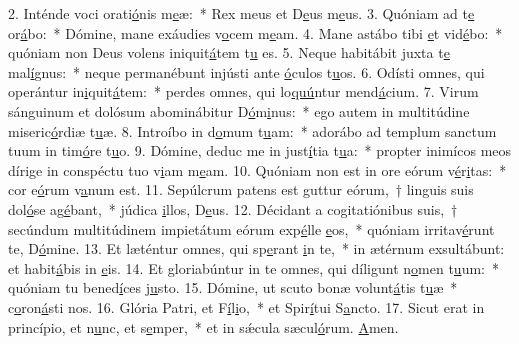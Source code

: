 2. Inténde voci orati\uline{ó}nis m\uline{e}æ:~* Rex meus et D\uline{e}us m\uline{e}us.
3. Quóniam ad t\uline{e} or\uline{á}bo:~* Dómine, mane exáudies v\uline{o}cem m\uline{e}am.
4. Mane astábo tibi \uline{e}t vid\uline{é}bo:~* quóniam non Deus volens iniquit\uline{á}tem t\uline{u} es.
5. Neque habitábit juxta t\uline{e} mal\uline{í}gnus:~* neque permanébunt injústi ante \uline{ó}culos t\uline{u}os.
6. Odísti omnes, qui operántur in\uline{i}quit\uline{á}tem:~* perdes omnes, qui lo\uline{quú}ntur mend\uline{á}cium.
7. Virum sánguinum et dolósum abominábitur D\uline{ó}m\uline{i}nus:~* ego autem in multitúdine miseric\uline{ó}rdiæ t\uline{u}æ.
8. Introíbo in d\uline{o}mum t\uline{u}am:~* adorábo ad templum sanctum tuum in tim\uline{ó}re t\uline{u}o.
9. Dómine, deduc me in just\uline{í}tia t\uline{u}a:~* propter inimícos meos dírige in conspéctu tuo v\uline{i}am m\uline{e}am.
10. Quóniam non est in ore eórum v\uline{é}r\uline{i}tas:~* cor e\uline{ó}rum v\uline{a}num est.
11. Sepúlcrum patens est guttur eórum,~† linguis suis dol\uline{ó}se ag\uline{é}bant,~* júdica \uline{i}llos, D\uline{e}us.
12. Décidant a cogitatiónibus suis,~† secúndum multitúdinem impietátum eórum exp\uline{é}lle \uline{e}os,~* quóniam irritav\uline{é}runt te, D\uline{ó}mine.
13. Et læténtur omnes, qui sp\uline{e}rant \uline{i}n te,~* in ætérnum exsultábunt: et habit\uline{á}bis in \uline{e}is.
14. Et gloriabúntur in te omnes, qui díligunt n\uline{o}men t\uline{u}um:~* quóniam tu bened\uline{í}ces j\uline{u}sto.
15. Dómine, ut scuto bonæ volunt\uline{á}tis t\uline{u}æ~* c\uline{o}ron\uline{á}sti nos.
16. Glória Patri, et F\uline{í}l\uline{i}o,~* et Spir\uline{í}tui S\uline{a}ncto.
17. Sicut erat in princípio, et n\uline{u}nc, et s\uline{e}mper,~* et in sǽcula sæcul\uline{ó}rum. \uline{A}men.
